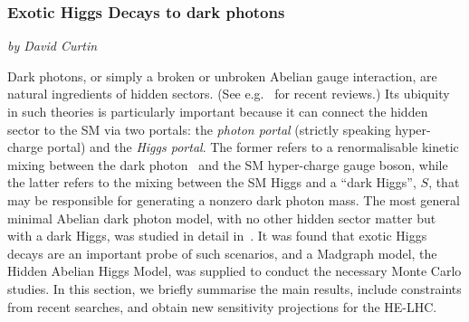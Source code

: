 \subsubsection{Exotic Higgs Decays to dark photons}

\begin{center}
    {\it{ by David Curtin}}
\end{center} 







Dark photons, or simply a broken or unbroken Abelian gauge interaction, are natural ingredients of hidden sectors. (See e.g.~\cite{Jaeckel:2010ni,Hewett:2012ns,Essig:2013lka,Alexander:2016aln,Battaglieri:2017aum} for recent reviews.) Its ubiquity in such theories is particularly important because it can connect the hidden sector to the SM via two portals: the \emph{photon portal} (strictly speaking hyper-charge portal) and the \emph{Higgs portal}. The former refers to a renormalisable kinetic mixing between the dark photon~\cite{Holdom:1985ag,Galison:1983pa,Dienes:1996zr} and the SM hyper-charge gauge boson, while the latter refers to the mixing between the SM Higgs and a ``dark Higgs'', $S$, that may be responsible for generating a nonzero dark photon mass. 
%
The most general minimal Abelian dark photon model, with no other hidden sector matter but with a dark Higgs, was studied in detail in~\cite{Curtin:2014cca}. It was found that exotic Higgs decays are an important probe of such scenarios, and a Madgraph \cite{Alwall:2011uj} model, the Hidden Abelian Higgs Model, was supplied to conduct the necessary Monte Carlo studies. In this section, we briefly summarise the main results, include constraints from recent searches, and obtain new sensitivity projections for the HE-LHC. 


